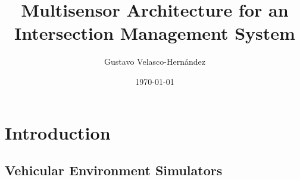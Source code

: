 \documentclass{book}
\begin{document}
\title{Multisensor Architecture for an Intersection Management System}
\vfill
\vfill
\vfill
\author{Gustavo Velasco-Hernández}
\vfill
\vfill
\vfill
\date{\today}
\maketitle

\tableofcontents
\setcounter{tocdepth}{3}

\listoffigures

\listoftables

\chapter {Introduction}






\begin{appendices}
	\chapter {Vehicular Environment Simulators}
	
\end{appendices}



%
\end{document}
